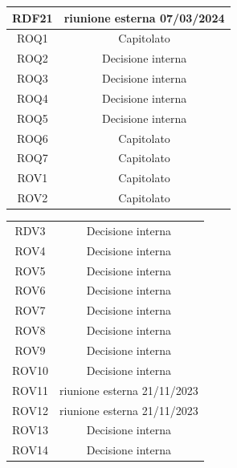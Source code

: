 \documentclass{article}
\newcommand{\custombold}{\contour{black}}
\begin{document}
\begin{center}
\begin{tabular}{c|c}
RDF21 & riunione esterna 07/03/2024\\
\hline
\rowcolor{LightBlue}
ROQ1 & Capitolato\\
\hline
\rowcolor{LighterBlue}
ROQ2 & Decisione interna\\
\hline
\rowcolor{LightBlue}
ROQ3 & Decisione interna\\
\hline
\rowcolor{LighterBlue}
ROQ4 & Decisione interna\\
\hline
\rowcolor{LightBlue}
ROQ5 & Decisione interna\\
\hline
\rowcolor{LighterBlue}
ROQ6 & Capitolato\\
\hline
\rowcolor{LightBlue}
ROQ7 & Capitolato\\
\hline
\rowcolor{LighterBlue}
ROV1 & Capitolato\\
\hline
\rowcolor{LightBlue}
ROV2 & Capitolato\\
\hline

\end{tabular}
\end{center}
\begin{center}
\begin{tabular}{c|c}
\hline
\rowcolor{Blue}
\custombold{ID}&\custombold{Fonte}\\
\hline
\rowcolor{LighterBlue}
RDV3 & Decisione interna\\
\hline
\rowcolor{LightBlue}
ROV4 & Decisione interna\\
\hline
\rowcolor{LighterBlue}
ROV5 & Decisione interna\\
\hline
\rowcolor{LightBlue}
ROV6 & Decisione interna\\
\hline
\rowcolor{LighterBlue}
ROV7 & Decisione interna\\
\hline
\rowcolor{LightBlue}
ROV8 & Decisione interna\\
\hline
\rowcolor{LighterBlue}
ROV9 & Decisione interna\\
\hline
\rowcolor{LightBlue}
ROV10 & Decisione interna\\
\hline
\rowcolor{LighterBlue}
ROV11 & riunione esterna 21/11/2023\\
\hline
\rowcolor{LightBlue}
ROV12 & riunione esterna 21/11/2023\\
\hline
\rowcolor{LighterBlue}
ROV13 & Decisione interna\\
\hline
\rowcolor{LightBlue}
ROV14 & Decisione interna\\
\hline
\end{tabular}
\label{tab:fonti}
\end{center}
\end{document}
